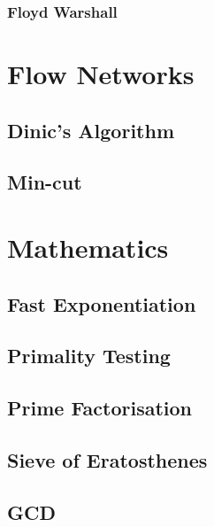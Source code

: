 \documentclass[11pt, letterpaper]{article}
\begin{document}
\subsubsection{Floyd Warshall}


\section{Flow Networks}

\subsection{Dinic's Algorithm}


\subsection{Min-cut}


\section{Mathematics}

\subsection{Fast Exponentiation}


\subsection{Primality Testing}


\subsection{Prime Factorisation}


\subsection{Sieve of Eratosthenes}


\subsection{GCD}

\end{document}
